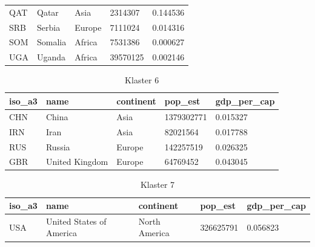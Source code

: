 \documentclass[11pt]{report}
\begin{document}
\begin{table}[h!]
\begin{tabular}{lllll}
            QAT                           & Qatar                     & Asia                           & 2314307                       & 0.144536                           \\
            SRB                           & Serbia                    & Europe                         & 7111024                       & 0.014316                           \\
            SOM                           & Somalia                   & Africa                         & 7531386                       & 0.000627                           \\
            UGA                           & Uganda                    & Africa                         & 39570125                      & 0.002146
        \end{tabular}
    \end{table}

    \begin{table}[h!]
        \caption {Klaster 6} \label{tab:cl6}
        \begin{tabular}{lllll}
            \hline
            \multicolumn{1}{|l|}{iso\_a3} & \multicolumn{1}{l|}{name} & \multicolumn{1}{l|}{continent} & \multicolumn{1}{l|}{pop\_est} & \multicolumn{1}{l|}{gdp\_per\_cap} \\ \hline
            CHN                           & China                     & Asia                           & 1379302771                    & 0.015327                           \\
            IRN                           & Iran                      & Asia                           & 82021564                      & 0.017788                           \\
            RUS                           & Russia                    & Europe                         & 142257519                     & 0.026325                           \\
            GBR                           & United Kingdom            & Europe                         & 64769452                      & 0.043045
        \end{tabular}
    \end{table}

    \begin{table}[h!]
        \caption {Klaster 7} \label{tab:cl7}
        \begin{tabular}{lllll}
            \hline
            \multicolumn{1}{|l|}{iso\_a3} & \multicolumn{1}{l|}{name} & \multicolumn{1}{l|}{continent} & \multicolumn{1}{l|}{pop\_est} & \multicolumn{1}{l|}{gdp\_per\_cap} \\ \hline
            USA                           & United States of America  & North America                  & 326625791                     & 0.056823
        \end{tabular}
    \end{table}
\end{document}
